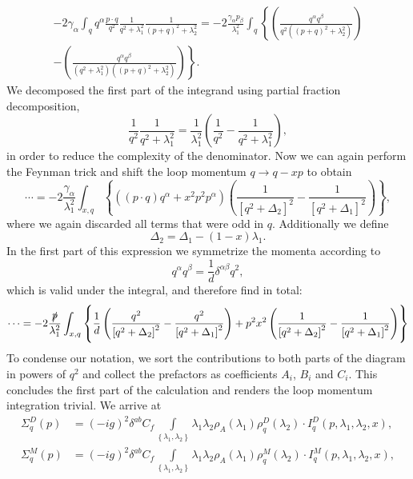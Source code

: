 \begin{equation}
	\begin{aligned}
		-2\gamma_{\alpha} \int_q q^{\alpha}\frac{p\cdot q}{q^2} \frac{1}{q^2 + \lambda_1^2}\frac{1}{(p+q)^2 + \lambda_2^2} = -2\frac{\gamma_{\alpha}p_{\beta}}{\lambda_1^2}\int_q\left\{\left(\frac{ q^{\alpha}q^{\beta}}{q^2 ((p+q)^2 + \lambda_2^2)}\right)\right.\\ \left. - \left(\frac{ q^{\alpha}q^{\beta}}{(q^2 + \lambda_1^2)((p+q)^2 + \lambda_2^2)}\right)\right\}.
	\end{aligned}
\end{equation}
We decomposed the first part of the integrand using partial fraction decomposition,
\begin{equation}
\frac{1}{q^{2}} \frac{1}{q^{2}+\lambda_1^{2}}=\frac{1}{\lambda_1^{2}}\left(\frac{1}{q^{2}}-\frac{1}{q^{2}+\lambda_1^{2}}\right),
\end{equation}
in order to reduce the complexity of the denominator. Now we can again perform the Feynman trick and shift the loop momentum $q\rightarrow q-xp$ to obtain
\begin{equation}
	\cdots = -2\frac{\gamma_{\alpha}}{\lambda_1^2}\int_{x,q}\left\{ \left((p\cdot q)q^{\alpha} + x^2p^2p^{\alpha}\right)\left(\frac{1}{\left[q^2 + \Delta_2\right]^2} - \frac{1}{\left[q^2 + \Delta_1\right]^2}\right) \right\},
\end{equation}
where we again discarded all terms that were odd in $q$. Additionally we define
\begin{equation}
	\Delta_2 = \Delta_1 - (1-x)\lambda_1.
\end{equation}
In the first part of this expression we symmetrize the momenta according to 
\begin{equation}
	q^{\alpha}q^{\beta} = \frac{1}{d}\delta^{\alpha\beta}q^2,
\end{equation}
which is valid under the integral, and therefore find in total:
\begin{equation}
	\cdots = -2\frac{\slashed{p}}{\lambda_1^2}\int_{x,q}\left\{\frac{1}{d}\left(\frac{q^2}{\left[q^2 + \Delta_2\right]^2} - \frac{q^2}{\left[q^2 + \Delta_1\right]^2}\right) + p^2x^2\left(\frac{1}{\left[q^2 + \Delta_2\right]^2} - \frac{1}{\left[q^2 + \Delta_1\right]^2}\right)\right\}
\end{equation}
To condense our notation, we sort the contributions to both parts of the diagram in  powers of $q^2$ and collect the prefactors as coefficients $A_i$, $B_i$ and $C_i$. This concludes the first part of the calculation and renders the loop momentum integration trivial. We arrive at
\begin{align}
\Sigma_{q}^D(p) &= (-ig)^2\delta^{ab}C_f\int\limits_{\left\{\lambda_1,\lambda_2\right\}}\lambda_1\lambda_2\rho_A(\lambda_1)\rho_q^D(\lambda_2)\cdot I_q^D\left(p, \lambda_1, \lambda_2,x\right),\\
\Sigma_{q}^M(p) &= (-ig)^2\delta^{ab}C_f\int\limits_{\left\{\lambda_1,\lambda_2\right\}}\lambda_1\lambda_2\rho_A(\lambda_1)\rho_q^M(\lambda_2)\cdot I_q^M\left(p, \lambda_1, \lambda_2,x\right),
\end{align}


